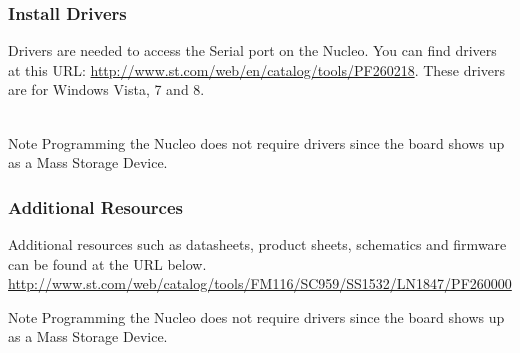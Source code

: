 \begin{frame}
	\frametitle{Install Drivers}
	Drivers are needed to access the Serial port on the Nucleo.  You can find drivers at this URL: \url{http://www.st.com/web/en/catalog/tools/PF260218}.  These drivers are for Windows Vista, 7 and 8. \ \\ \ \\
	\begin{block}{Note}
		Programming the Nucleo does not require drivers since the board shows up as a Mass Storage Device.
	\end{block}  
\end{frame}

\begin{frame}
	\frametitle{Additional Resources}
	Additional resources such as datasheets, product sheets, schematics and firmware can be found at the URL below.
	\url{http://www.st.com/web/catalog/tools/FM116/SC959/SS1532/LN1847/PF260000}
	\begin{block}{Note}
		Programming the Nucleo does not require drivers since the board shows up as a Mass Storage Device.
	\end{block}  
\end{frame}